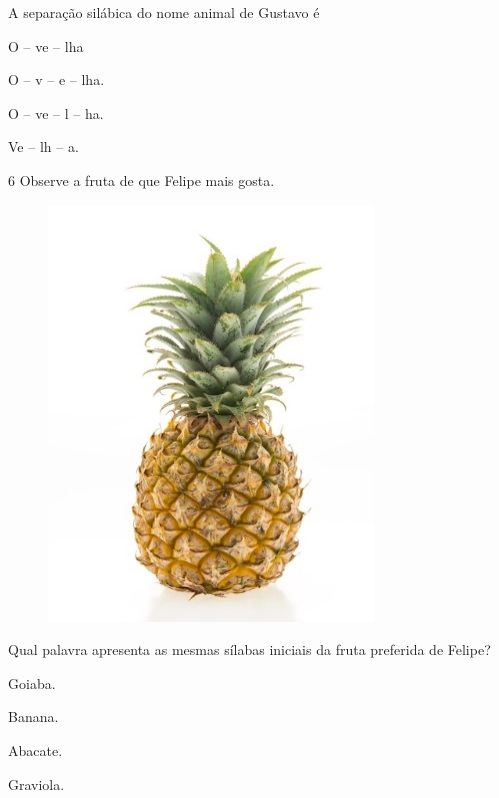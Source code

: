 
A separação silábica do nome animal de Gustavo é

\begin{escolha}
\item O -- ve -- lha

\item O -- v -- e -- lha.

\item O -- ve -- l -- ha.

\item Ve -- lh -- a.
\end{escolha}

\num{6} Observe a fruta de que Felipe mais gosta.

\begin{figure}[htpb!]
\centering
\includegraphics[width=.35\textwidth]{media/image143.jpeg}
\end{figure}


\pagebreak
Qual palavra apresenta as mesmas sílabas iniciais da fruta preferida de Felipe?

\begin{multicols}{2}
\begin{escolha}
\item Goiaba.

\item Banana.

\item Abacate.

\item Graviola.
\end{escolha}
\end{multicols}


